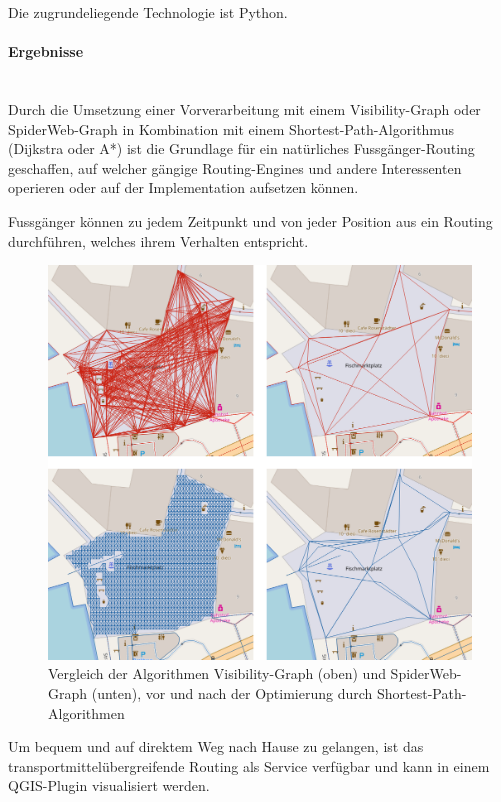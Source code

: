 Die zugrundeliegende Technologie ist Python.

\paragraph{Ergebnisse}~\\
Durch die Umsetzung einer Vorverarbeitung mit einem Visibility-Graph oder SpiderWeb-Graph in Kombination mit einem Shortest-Path-Algorithmus (Dijkstra oder A*) ist die Grundlage für ein natürliches Fussgänger-Routing geschaffen, auf welcher gängige Routing-Engines und andere Interessenten operieren oder auf der Implementation aufsetzen können.

Fussgänger können zu jedem Zeitpunkt und von jeder Position aus ein Routing durchführen, welches ihrem Verhalten entspricht.

\begin{figure}[H]
    \centering
    \includegraphics[width=0.8\linewidth]{technicalreport/img/proprecessing_optimization_comparison.png}
    \caption[Vergleich Preprocessing mit und ohne Optimierung]{Vergleich der Algorithmen Visibility-Graph (oben) und SpiderWeb-Graph (unten), vor und nach der Optimierung durch Shortest-Path-Algorithmen}
    \label{fig:proprecessing_optimization_comparison}
\end{figure}

Um bequem und auf direktem Weg nach Hause zu gelangen, ist das transportmittelübergreifende Routing als Service verfügbar und kann in einem QGIS-Plugin visualisiert werden.

